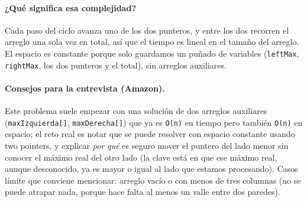 


\paragraph{¿Qué significa esa complejidad?} Cada paso del ciclo avanza uno
de los dos punteros, y entre los dos recorren el arreglo una sola vez en
total, así que el tiempo es lineal en el tamaño del arreglo. El espacio es
constante porque solo guardamos un puñado de variables (\texttt{leftMax},
\texttt{rightMax}, los dos punteros y el total), sin arreglos auxiliares.

\paragraph{Consejos para la entrevista (Amazon).} Este problema suele
empezar con una solución de dos arreglos auxiliares
(\texttt{maxIzquierda[]}, \texttt{maxDerecha[]}) que ya es \texttt{O(n)}
en tiempo pero también \texttt{O(n)} en espacio; el reto real es notar que
se puede resolver con espacio constante usando two pointers, y explicar
\emph{por qué} es seguro mover el puntero del lado menor sin conocer el
máximo real del otro lado (la clave está en que ese máximo real, aunque
desconocido, ya es mayor o igual al lado que estamos procesando). Casos
límite que conviene mencionar: arreglo vacío o con menos de tres columnas
(no se puede atrapar nada, porque hace falta al menos un valle entre dos
paredes).
